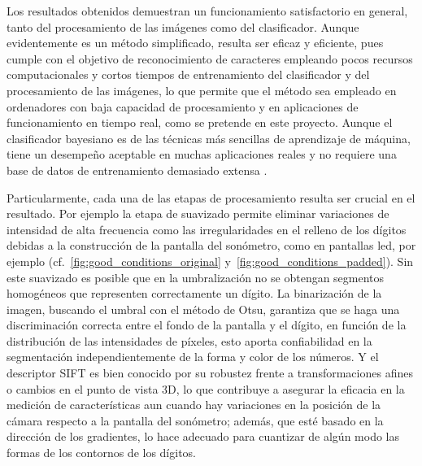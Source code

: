 Los resultados obtenidos demuestran un funcionamiento satisfactorio en general, tanto del procesamiento de las imágenes como del clasificador.
Aunque evidentemente es un método simplificado, resulta ser eficaz y eficiente, pues cumple con el objetivo de reconocimiento de caracteres empleando pocos recursos computacionales y cortos tiempos de entrenamiento del clasificador y del procesamiento de las imágenes, lo que permite que el método sea empleado en ordenadores con baja capacidad de procesamiento y en aplicaciones de funcionamiento en tiempo real, como se pretende en este proyecto.
Aunque el clasificador bayesiano es de las técnicas más sencillas de aprendizaje de máquina, tiene un desempeño aceptable en muchas aplicaciones reales y no requiere una base de datos de entrenamiento demasiado extensa .

Particularmente, cada una de las etapas de procesamiento resulta ser crucial en el resultado.
Por ejemplo la etapa de suavizado permite eliminar variaciones de intensidad de alta frecuencia como las irregularidades en el relleno de los dígitos debidas a la construcción de la pantalla del sonómetro, como en pantallas led, por ejemplo (cf.~\ref{fig:good_conditions_original} y~\ref{fig:good_conditions_padded}).
Sin este suavizado es posible que en la umbralización no se obtengan segmentos homogéneos que representen correctamente un dígito.
La binarización de la imagen, buscando el umbral con el método de Otsu, garantiza que se haga una discriminación correcta entre el fondo de la pantalla y el dígito, en función de la distribución de las intensidades de píxeles, esto aporta confiabilidad en la segmentación independientemente de la forma y color de los números.
Y el descriptor SIFT es bien conocido por su robustez frente a transformaciones afines o cambios en el punto de vista 3D, lo que contribuye a asegurar la eficacia en la medición de características aun cuando hay variaciones en la posición de la cámara respecto a la pantalla del sonómetro;
además, que esté basado en la dirección de los gradientes, lo hace adecuado para cuantizar de algún modo las formas de los contornos de los dígitos.

